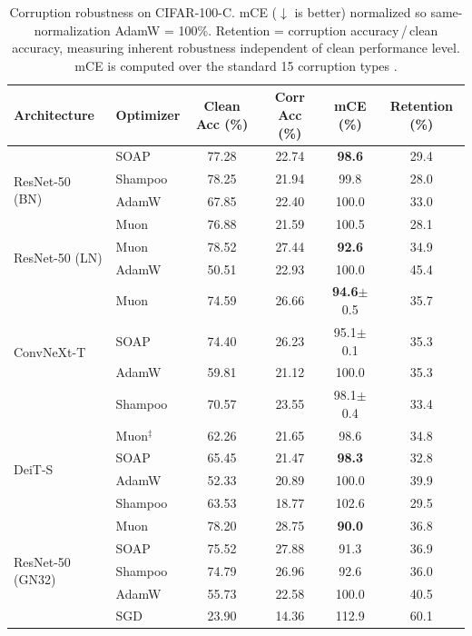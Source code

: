 \begin{table}[h]
\centering
\caption{Corruption robustness on CIFAR-100-C. mCE ($\downarrow$ is better) normalized so same-normalization AdamW = 100\%. Retention = corruption accuracy\,/\,clean accuracy, measuring inherent robustness independent of clean performance level. mCE is computed over the standard 15 corruption types \citep{hendrycks2019benchmarking}.}
\label{tab:corruption_robustness}
\small
\begin{tabular}{llcccc}
\toprule
Architecture & Optimizer & Clean Acc (\%) & Corr Acc (\%) & mCE (\%) & Retention (\%) \\
\midrule
\multirow{4}{*}{ResNet-50 (BN)} & SOAP & 77.28 & 22.74 & \textbf{98.6} & 29.4 \\
 & Shampoo & 78.25 & 21.94 & 99.8 & 28.0 \\
 & AdamW & 67.85 & 22.40 & 100.0 & 33.0 \\
 & Muon & 76.88 & 21.59 & 100.5 & 28.1 \\
\midrule
\multirow{2}{*}{ResNet-50 (LN)} & Muon & 78.52 & 27.44 & \textbf{92.6} & 34.9 \\
 & AdamW & 50.51 & 22.93 & 100.0 & 45.4 \\
\midrule
\multirow{4}{*}{ConvNeXt-T} & Muon & 74.59 & 26.66 & \textbf{94.6}{\scriptsize$\pm$0.5} & 35.7 \\
 & SOAP & 74.40 & 26.23 & 95.1{\scriptsize$\pm$0.1} & 35.3 \\
 & AdamW & 59.81 & 21.12 & 100.0 & 35.3 \\
 & Shampoo & 70.57 & 23.55 & 98.1{\scriptsize$\pm$0.4} & 33.4 \\
\midrule
\multirow{4}{*}{DeiT-S} & Muon$^\ddagger$ & 62.26 & 21.65 & 98.6 & 34.8 \\
 & SOAP & 65.45 & 21.47 & \textbf{98.3} & 32.8 \\
 & AdamW & 52.33 & 20.89 & 100.0 & 39.9 \\
 & Shampoo & 63.53 & 18.77 & 102.6 & 29.5 \\
\midrule
\multirow{5}{*}{ResNet-50 (GN32)} & Muon & 78.20 & 28.75 & \textbf{90.0} & 36.8 \\
 & SOAP & 75.52 & 27.88 & 91.3 & 36.9 \\
 & Shampoo & 74.79 & 26.96 & 92.6 & 36.0 \\
 & AdamW & 55.73 & 22.58 & 100.0 & 40.5 \\
 & SGD & 23.90 & 14.36 & 112.9 & 60.1 \\
\bottomrule
\end{tabular}
\vspace{0.3em}

\end{table}
